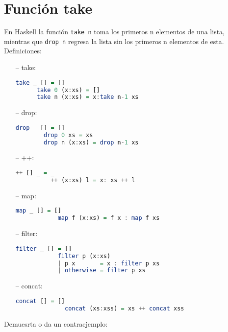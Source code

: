 \documentclass[spanish,12pt,letterpaper]{article}
\begin{document}
  \section{Función take}
  En Haskell la función \texttt{take n} toma los primeros n elementos de una lista,
  mientras que \texttt{drop n} regresa la lista sin los primeros n elementos de
  esta.\\
  \noindent Definiciones:
  \begin{itemize}
  \item[--] take:
    \begin{lstlisting}[language=Haskell]
      take _ [] = []
      take 0 (x:xs) = []
      take n (x:xs) = x:take n-1 xs\end{lstlisting}
    \item[--] drop:
      \begin{lstlisting}[language=Haskell]
        drop _ [] = []
        drop 0 xs = xs
        drop n (x:xs) = drop n-1 xs\end{lstlisting}
      \item[--] ++:
        \begin{lstlisting}[language=Haskell]
          ++ [] _ = _
          ++ (x:xs) l = x: xs ++ l\end{lstlisting}

        \item[--] map:
          \begin{lstlisting}[language=Haskell]
            map _ [] = []
            map f (x:xs) = f x : map f xs
          \end{lstlisting}


        \item[--] filter:
          \begin{lstlisting}[language=Haskell]
            filter _ [] = []
            filter p (x:xs)
            | p x       = x : filter p xs
            | otherwise = filter p xs\end{lstlisting}


          \item[--] concat:
            \begin{lstlisting}[language=Haskell]
              concat [] = []
              concat (xs:xss) = xs ++ concat xss\end{lstlisting}

  \end{itemize}
  \noindent Demuesrta o da un contraejemplo:
\end{document}
